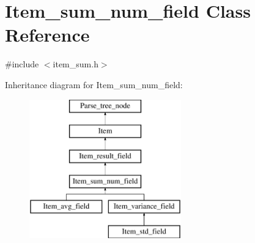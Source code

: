 \hypertarget{classItem__sum__num__field}{}\section{Item\+\_\+sum\+\_\+num\+\_\+field Class Reference}
\label{classItem__sum__num__field}


{\ttfamily \#include $<$item\+\_\+sum.\+h$>$}

Inheritance diagram for Item\+\_\+sum\+\_\+num\+\_\+field\+:\begin{figure}[H]
\begin{center}
\leavevmode
\includegraphics[height=6.000000cm]{classItem__sum__num__field}
\end{center}
\end{figure}
